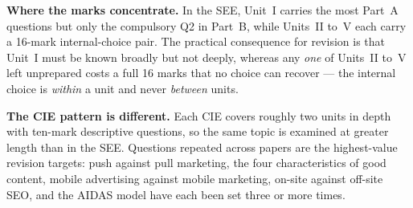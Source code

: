\vspace{6pt}
\begin{tcolorbox}[colback=tint,colframe=ocre,boxrule=0.8pt,sharp corners,
  fontupper=\small, breakable]
\textbf{\sffamily Where the marks concentrate.} In the SEE, Unit~I carries the
most Part~A questions but only the compulsory Q2 in Part~B, while Units~II
to~V each carry a 16-mark internal-choice pair. The practical consequence for
revision is that Unit~I must be known broadly but not deeply, whereas any
\emph{one} of Units~II to~V left unprepared costs a full 16 marks that no choice
can recover --- the internal choice is \emph{within} a unit and never
\emph{between} units.

\vspace{4pt}
\textbf{\sffamily The CIE pattern is different.} Each CIE covers roughly two
units in depth with ten-mark descriptive questions, so the same topic is
examined at greater length than in the SEE. Questions repeated across papers are
the highest-value revision targets: push against pull marketing, the four
characteristics of good content, mobile advertising against mobile marketing,
on-site against off-site SEO, and the AIDAS model have each been set three or
more times.
\end{tcolorbox}
